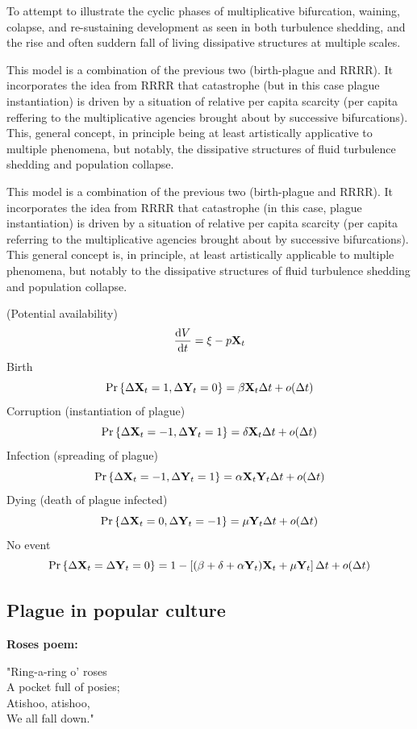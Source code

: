 To attempt to illustrate the cyclic phases of multiplicative bifurcation, waining, colapse, and re-sustaining development as seen in both turbulence shedding, and the rise and often suddern fall of living dissipative structures at multiple scales. \par 

\vspace{10pt}
This model is a combination of the previous two (birth-plague and RRRR).  It incorporates the idea from RRRR that catastrophe (but in this case plague instantiation) is driven by a situation of relative per capita scarcity (per capita reffering to the multiplicative agencies brought about by successive bifurcations).  This, general concept, in principle being at least artistically applicative to multiple phenomena,  but notably, the dissipative structures of fluid turbulence shedding and population collapse. 

This model is a combination of the previous two (birth-plague and RRRR). It incorporates the idea from RRRR that catastrophe (in this case, plague instantiation) is driven by a situation of relative per capita scarcity (per capita referring to the multiplicative agencies brought about by successive bifurcations). This general concept is, in principle, at least artistically applicable to multiple phenomena, but notably to the dissipative structures of fluid turbulence shedding and population collapse.

(Potential availability)
 $$\displaystyle\frac{{\rm d} V}{{\rm d} t} = \xi - p {{\bf X}_t}$$
Birth
$${\text{Pr}\left\{\Delta {{\bf X}_t} = 1, \Delta {{\bf Y}_t} = 0\right\}} = \beta {{\bf X}_t} \Delta t +o(\Delta t)$$
Corruption (instantiation of plague)
$${\text{Pr}\left\{\Delta {{\bf X}_t} = -1, \Delta {{\bf Y}_t} = 1\right\}} = \delta {{\bf X}_t} \Delta t +o(\Delta t)$$
Infection (spreading of plague)
$${\text{Pr}\left\{\Delta {{\bf X}_t} = -1, \Delta {{\bf Y}_t} = 1\right\}} = \alpha {{\bf X}_t}{{\bf Y}_t} \Delta t +o(\Delta t)$$
Dying (death of plague infected)
$${\text{Pr}\left\{\Delta {{\bf X}_t} = 0, \Delta {{\bf Y}_t} = -1\right\}} = \mu {{\bf Y}_t} \Delta t +o(\Delta t)$$
No event
$${\text{Pr}\left\{\Delta {{\bf X}_t} = \Delta {{\bf Y}_t} = 0\right\}} =1 - \left[(\beta + \delta + \alpha {{\bf Y}_t}) {{\bf X}_t} + \mu {{\bf Y}_t}\right] \Delta t +o(\Delta t)$$





\subsection*{Plague in popular culture}

\textbf{Roses poem:}\\

\begin{center}
"Ring-a-ring o’ roses\\
A pocket full of posies;\\
Atishoo, atishoo,\\
We all fall down."
\end{center}

